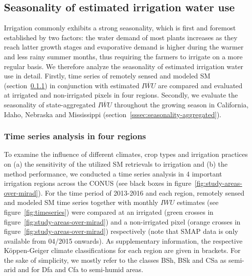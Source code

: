 \documentclass[hess, manuscript]{copernicus}
\begin{document}
\subsection{Seasonality of estimated irrigation water use}
\label{ssec:seasonality}
Irrigation commonly exhibits a strong seasonality, which is first and foremost established by two factors: the water demand of most plants increases as they reach latter growth stages and evaporative demand is higher during the warmer and less rainy summer months, thus requiring the farmers to irrigate on a more regular basis. We therefore analyze the seasonality of estimated irrigation water use in detail. Firstly, time series of remotely sensed and modeled SM (section~\ref{sssec:seasonality-timeseries}) in conjunction with estimated $\overline{IWU}$ are compared and evaluated at irrigated and non-irrigated pixels in four regions. Secondly, we evaluate the seasonality of state-aggregated $\overline{IWU}$ throughout the growing season in California, Idaho, Nebraska and Mississippi (section~\ref{sssec:seasonality-aggregated}).

\subsubsection{Time series analysis in four regions}
\label{sssec:seasonality-timeseries}
To examine the influence of different climates, crop types and irrigation practices on (a) the sensitivity of the utilized SM retrievals to irrigation and (b) the method performance, we conducted a time series analysis in 4 important irrigation regions across the CONUS (see black boxes in figure~\ref{fig:study-areas-over-mirad}). For the time period of 2013-2016 and each region, remotely sensed and modeled SM time series together with monthly $IWU$ estimates (see figure~\ref{fig:timeseries}) were compared at an irrigated (green crosses in figure~\ref{fig:study-areas-over-mirad}) and a non-irrigated pixel (orange crosses in figure~\ref{fig:study-areas-over-mirad}) respectively (note that SMAP data is only available from 04/2015 onwards). As supplementary information, the respective Köppen-Geiger climate classifications \citep{kottek2006world,rubel2016climate} for each region are given in brackets. For the sake of simplicity, we mostly refer to the classes BSh, BSk and CSa as semi-arid and for Dfa and Cfa to semi-humid areas.\\
\end{document}
